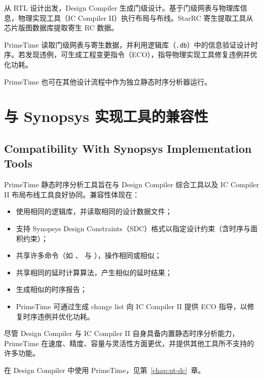 
从 RTL 设计出发，Design Compiler 生成门级设计。基于门级网表与物理库信息，物理实现工具（IC Compiler II）执行布局与布线。StarRC 寄生提取工具从芯片版图数据库提取寄生 RC 数据。

PrimeTime 读取门级网表与寄生数据，并利用逻辑库（\texttt{.db}）中的信息验证设计时序。若发现违例，可生成工程变更指令（ECO），指导物理实现工具修复违例并优化功耗。

PrimeTime 也可在其他设计流程中作为独立静态时序分析器运行。

\section{与 Synopsys 实现工具的兼容性}
\subsection*{Compatibility With Synopsys Implementation Tools}

PrimeTime 静态时序分析工具旨在与 Design Compiler 综合工具以及 IC Compiler II 布局布线工具良好协同。兼容性体现在：
\begin{itemize}
  \item 使用相同的逻辑库，并读取相同的设计数据文件；
  \item 支持 Synopsys Design Constraints（SDC）格式以指定设计约束（含时序与面积约束）；
  \item 共享许多命令（如 、 与 ），操作相同或相似；
  \item 共享相同的延时计算算法，产生相似的延时结果；
  \item 生成相似的时序报告；
  \item PrimeTime 可通过生成 change list 向 IC Compiler II 提供 ECO 指导，以修复时序违例并优化功耗。
\end{itemize}

尽管 Design Compiler 与 IC Compiler II 自身具备内置静态时序分析能力，PrimeTime 在速度、精度、容量与灵活性方面更优，并提供其他工具所不支持的许多功能。

\begin{seeAlsoBox}
在 Design Compiler 中使用 PrimeTime，见第~\ref{chap:pt-dc}~章。
\end{seeAlsoBox}


